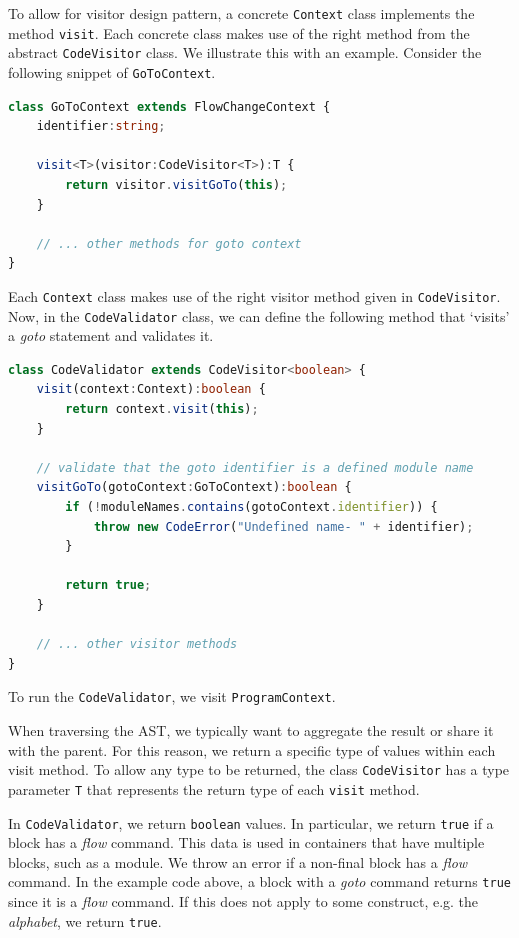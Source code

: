 To allow for visitor design pattern, a concrete \texttt{Context} class implements the method \texttt{visit}. Each concrete class makes use of the right method from the abstract \texttt{CodeVisitor} class. We illustrate this with an example. Consider the following snippet of \texttt{GoToContext}.
\begin{lstlisting}[language=TypeScript]
class GoToContext extends FlowChangeContext {    
    identifier:string;
    
    visit<T>(visitor:CodeVisitor<T>):T {
        return visitor.visitGoTo(this);
    }

    // ... other methods for goto context
}
\end{lstlisting}
    Each \texttt{Context} class makes use of the right visitor method given in \texttt{CodeVisitor}. Now, in the \texttt{CodeValidator} class, we can define the following method that `visits' a \textit{goto} statement and validates it.
\begin{lstlisting}[language=TypeScript]
class CodeValidator extends CodeVisitor<boolean> {
    visit(context:Context):boolean {
        return context.visit(this);
    }
    
    // validate that the goto identifier is a defined module name
    visitGoTo(gotoContext:GoToContext):boolean {
        if (!moduleNames.contains(gotoContext.identifier)) {
            throw new CodeError("Undefined name- " + identifier);
        }

        return true;
    }

    // ... other visitor methods
}
\end{lstlisting}
To run the \texttt{CodeValidator}, we visit \texttt{ProgramContext}.

When traversing the AST, we typically want to aggregate the result or share it with the parent. For this reason, we return a specific type of values within each visit method. To allow any type to be returned, the class \texttt{CodeVisitor} has a type parameter \texttt{T} that represents the return type of each \texttt{visit} method.

In \texttt{CodeValidator}, we return \texttt{boolean} values. In particular, we return \texttt{true} if a block has a \textit{flow} command. This data is used in containers that have multiple blocks, such as a module. We throw an error if a non-final block has a \textit{flow} command. In the example code above, a block with a \textit{goto} command returns \texttt{true} since it is a \textit{flow} command. If this does not apply to some construct, e.g. the \textit{alphabet}, we return \texttt{true}.

